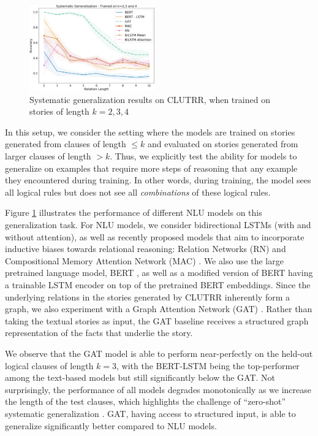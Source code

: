 \documentclass[12pt]{article}
\begin{document}
\begin{figure}
\begin{center}
  \includegraphics[width=0.48\textwidth]{images/clutrr_sys_gen_234.png}
\end{center}
\caption{Systematic generalization results on CLUTRR, when trained on stories of length $k=2,3,4$}
\label{fig:clutrr_sys_gen_234}
\end{figure}

In this setup, we consider the setting where the models are trained on stories generated from clauses of length ${\leq k}$ and evaluated on stories generated from larger clauses of length ${>k}$. Thus, we explicitly test the ability for models to generalize on examples that require more steps of reasoning that any example they encountered during training.
In other words, during training, the model sees all logical rules but does not see all {\em combinations} of these logical rules.


Figure \ref{fig:clutrr_sys_gen_234} illustrates the performance of different NLU models on this generalization task. For NLU models, we consider bidirectional LSTMs \citep{hochreiter1997long, cho2014learning} (with and without attention), as well as recently proposed models that aim to incorporate inductive biases towards relational reasoning: Relation Networks (RN) \citep{santoro2017simple} and Compositional Memory Attention Network (MAC) \citep{hudson2018compositional}. We also use the large pretrained language model, BERT \cite{devlin2018bert}, as well as a modified version of BERT having a trainable LSTM encoder on top of the pretrained BERT embeddings. Since the underlying relations in the stories generated by CLUTRR inherently form a graph, we also experiment with a Graph Attention Network (GAT) \citep{Velickovic2017-mh}. Rather than taking the textual stories as input, the GAT baseline receives a structured graph representation of the facts that underlie the story.

We observe that the GAT model is able to perform near-perfectly on the held-out logical clauses of length $k=3$, with the BERT-LSTM being the top-performer among the text-based models but still significantly below the GAT.
Not surprisingly, the performance of all models degrades monotonically as we increase the length of the test clauses, which highlights the challenge of ``zero-shot'' systematic generalization \cite{lake2017generalization, 2018arXiv181107017S}.
GAT, having access to structured input, is able to generalize significantly better compared to NLU models.
\end{document}
